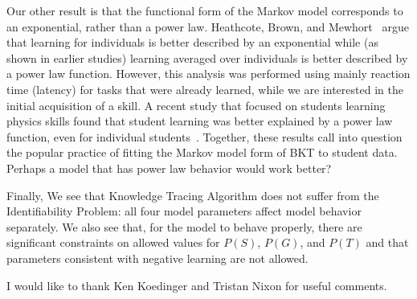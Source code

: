 \documentclass{acmlarge-edm}
\begin{document}
Our other result is that the functional form of the Markov model 
corresponds to an exponential, rather than a power law.  
Heathcote, Brown, and Mewhort~\cite{heathcote_power_2000}
argue that learning for individuals is better described by an
exponential while (as shown in earlier studies) learning averaged
over individuals is better described by a power law function.
However, this analysis was performed using mainly reaction time
(latency) for tasks that were already learned, while we are interested
in the initial acquisition of a skill.  A recent study that focused
on students learning physics skills found that student learning
was better explained by a power law function, even for individual 
students~\cite{min_chi_instructional_2011}.
Together, these results call into question the popular practice of 
fitting the Markov model form of BKT to student data. 
Perhaps a model that has power law behavior would work better?

Finally, We see that Knowledge Tracing Algorithm does not suffer from
the Identifiability Problem:  all four model parameters
affect model behavior separately.  
We also see that, for the model to behave properly,  there are 
significant constraints on allowed values for $P(S)$, $P(G)$, and $P(T)$
and that parameters consistent with negative learning are not allowed.

\begin{acks}
I would like to thank Ken Koedinger and Tristan Nixon for
useful comments.
\end{acks}


\end{document}
